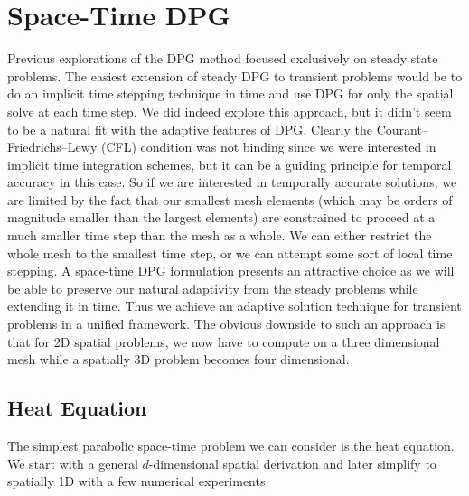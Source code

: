 \documentclass[preprint,12pt]{elsarticle}
\begin{document}
\section{Space-Time DPG}
Previous explorations of the DPG method focused exclusively on steady state problems.
The easiest extension of steady DPG to transient problems would be to do an implicit time stepping technique in time 
and use DPG for only the spatial solve at each time step.
We did indeed explore this approach, but it didn't seem to be a natural fit with the adaptive features of DPG.
Clearly the Courant–Friedrichs–Lewy (CFL) condition was not binding since we were interested in implicit time integration schemes, 
but it can be a guiding principle for temporal accuracy in this case.
So if we are interested in temporally accurate solutions, we are limited by the fact that our smallest mesh elements 
(which may be orders of magnitude smaller than the largest elements) are constrained to proceed at a much smaller time step than the mesh as a whole. 
We can either restrict the whole mesh to the smallest time step, or we can attempt some sort of local time stepping.
A space-time DPG formulation presents an attractive choice as we will be able to preserve our natural adaptivity 
from the steady problems while extending it in time.
Thus we achieve an adaptive solution technique for transient problems in a unified framework.
The obvious downside to such an approach is that for 2D spatial problems, 
we now have to compute on a three dimensional mesh while a spatially 3D problem becomes four dimensional.


%                                          
%                                          
%  
\subsection{Heat Equation}
The simplest parabolic space-time problem we can consider is the heat equation.
We start with a general $d$-dimensional spatial derivation and later simplify to spatially 1D with a few numerical experiments.
\end{document}
